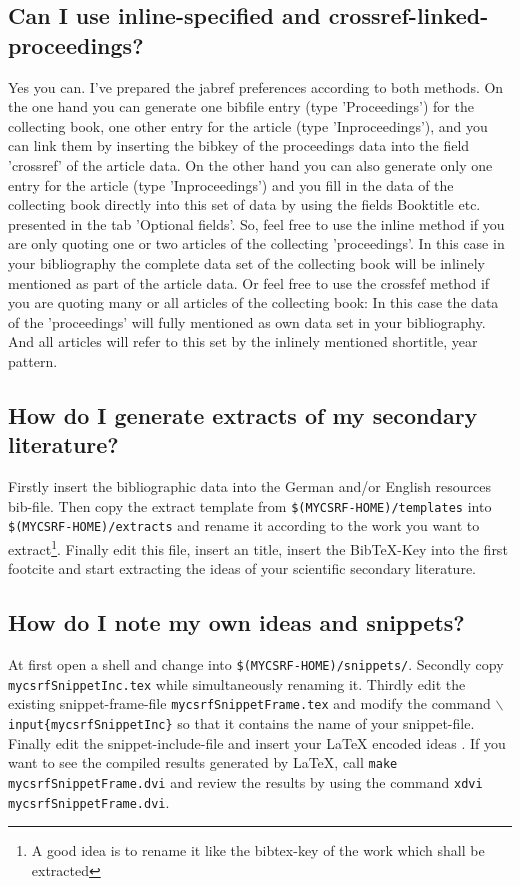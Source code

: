\documentclass[
  DIV=calc,
  BCOR=5mm,
  11pt,
  headings=small,
  oneside,
  abstract=true,
  toc=bib,
  ngerman,english]{scrartcl}
\begin{document}
\subsection{Can I use inline-specified and crossref-linked-proceedings?} 
Yes you can. I've prepared the jabref preferences according to both methods.
On the one hand you can generate one bibfile entry (type 'Proceedings') for the
collecting book, one other entry for the article (type 'Inproceedings'), and you
can link them by inserting the bibkey of the proceedings data into the field
'crossref' of the article data. On the other hand you can also generate only one
entry for the article (type 'Inproceedings') and you fill in the data of the
collecting book directly into this set of data by using the fields Booktitle
etc. presented in the tab 'Optional fields'. So, feel free to use the inline
method if you are only quoting one or two articles of the collecting
'proceedings'. In this case in your bibliography the complete data set of the
collecting book will be inlinely mentioned as part of the article data. Or feel
free to use the crossfef method if you are quoting many or all articles of the
collecting book: In this case the data of the 'proceedings' will fully mentioned
as own data set in your bibliography. And all articles will refer to this set by
the inlinely mentioned shortitle, year pattern.

\subsection{How do I generate extracts of my secondary literature?}
Firstly insert the bibliographic data into the German and/or English
resources bib-file. Then copy the extract template from
\texttt{\$(MYCSRF-HOME)/templates} into
\texttt{\$(MYCSRF-HOME)/extracts} and rename it according to the work you
want to extract\footnote{A good idea is to rename it like the bibtex-key of the
work which shall be extracted}. Finally edit this file, insert an title, insert
the BibTeX-Key into the first footcite and start extracting the ideas of your
scientific secondary literature.

\subsection{How do I note my own ideas and snippets?}
At first open a shell and change into \texttt{\$(MYCSRF-HOME)/snippets/}.
Se\-cond\-ly copy \texttt{mycsrfSnippetInc.tex} while simultaneously renaming
it. Thirdly edit the existing snippet-frame-file \texttt{mycsrfSnippetFrame.tex}
and modify the command \texttt{$\backslash$input\{mycsrfSnippetInc\}} so that it
contains the name of your snippet-file. Finally edit the snippet-include-file
and insert your LaTeX encoded ideas . If you want to see the compiled results
generated by LaTeX, call \texttt{make mycsrfSnippetFrame.dvi} and review the
results by using the command \texttt{xdvi mycsrfSnippetFrame.dvi}.
\end{document}
